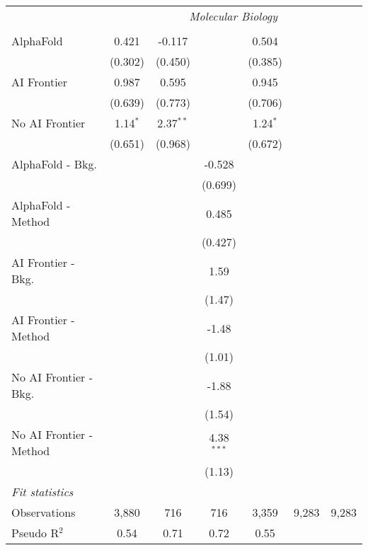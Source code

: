 \begin{tabular}{lcccccc}
 & \multicolumn{6}{c}{\textit{Molecular Biology}} \\ \\
   AlphaFold               & 0.421      & -0.117      &              & 0.504      &       &   \\   
                           & (0.302)    & (0.450)     &              & (0.385)    &       &   \\   
   AI Frontier             & 0.987      & 0.595       &              & 0.945      &       &   \\   
                           & (0.639)    & (0.773)     &              & (0.706)    &       &   \\   
   No AI Frontier          & 1.14$^{*}$ & 2.37$^{**}$ &              & 1.24$^{*}$ &       &   \\   
                           & (0.651)    & (0.968)     &              & (0.672)    &       &   \\   
   AlphaFold - Bkg.        &            &             & -0.528       &            &       &   \\   
                           &            &             & (0.699)      &            &       &   \\   
   AlphaFold - Method      &            &             & 0.485        &            &       &   \\   
                           &            &             & (0.427)      &            &       &   \\   
   AI Frontier - Bkg.      &            &             & 1.59         &            &       &   \\   
                           &            &             & (1.47)       &            &       &   \\   
   AI Frontier - Method    &            &             & -1.48        &            &       &   \\   
                           &            &             & (1.01)       &            &       &   \\   
   No AI Frontier - Bkg.   &            &             & -1.88        &            &       &   \\   
                           &            &             & (1.54)       &            &       &   \\   
   No AI Frontier - Method &            &             & 4.38$^{***}$ &            &       &   \\   
                           &            &             & (1.13)       &            &       &   \\   
   \midrule
   \emph{Fit statistics}\\
   Observations            & 3,880      & 716         & 716          & 3,359      & 9,283 & 9,283\\  
   Pseudo R$^2$            & 0.54       & 0.71        & 0.72         & 0.55       &       & \\  
   

\end{tabular}
